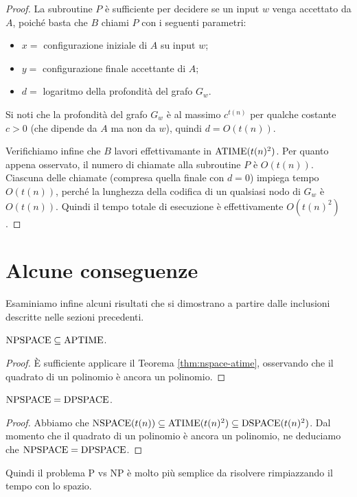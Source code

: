 \begin{proof}
  La subroutine $P$ è sufficiente per decidere se un input $w$ venga accettato da $A$, poiché basta che $B$ chiami $P$ con i seguenti parametri:
  \begin{itemize}
    \renewcommand{\labelitemi}{--}
    \item $x = $ configurazione iniziale di $A$ su input $w$;
    \item $y = $ configurazione finale accettante di $A$;
    \item $d = $ logaritmo della profondità del grafo $G_w$.
  \end{itemize}
  Si noti che la profondità del grafo $G_w$ è al massimo $c^{t(n)}$ per qualche costante $c>0$ (che dipende da $A$ ma non da $w$), quindi $d=O(t(n))$.
  
  Verifichiamo infine che $B$ lavori effettivamante in $\operatorname{ATIME}(t(n)^2)$.
  Per quanto appena osservato, il numero di chiamate alla subroutine $P$ è $O(t(n))$.
  Ciascuna delle chiamate (compresa quella finale con $d=0$) impiega tempo $O(t(n))$, perché la lunghezza della codifica di un qualsiasi nodo di $G_w$ è $O(t(n))$.
  Quindi il tempo totale di esecuzione è effettivamente $O(t(n)^2)$.
\end{proof}


\section{Alcune conseguenze}

Esaminiamo infine alcuni risultati che si dimostrano a partire dalle inclusioni descritte nelle sezioni precedenti.

\begin{corollario}
  $\operatorname{NPSPACE} \subseteq \operatorname{APTIME}$.
\end{corollario}

\begin{proof}
  È sufficiente applicare il Teorema \ref{thm:nspace-atime}, osservando che il quadrato di un polinomio è ancora un polinomio.
\end{proof}


\begin{corollario}
  \label{cor:npspace-dpspace}
  $\operatorname{NPSPACE} = \operatorname{DPSPACE}$.
\end{corollario}

\begin{proof}
  Abbiamo che $\operatorname{NSPACE}(t(n))\subseteq \operatorname{ATIME}(t(n)^2) \subseteq \operatorname{DSPACE}(t(n)^2)$.
  Dal momento che il quadrato di un polinomio è ancora un polinomio, ne deduciamo che $\operatorname{NPSPACE} = \operatorname{DPSPACE}$.
\end{proof}

Quindi il problema P vs NP è molto più semplice da risolvere rimpiazzando il tempo con lo spazio.


